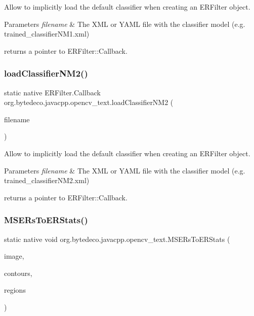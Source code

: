 Allow to implicitly load the default classifier when creating an E\+R\+Filter object. 


\begin{DoxyParams}{Parameters}
{\em filename} & The X\+ML or Y\+A\+ML file with the classifier model (e.\+g. trained\+\_\+classifier\+N\+M1.\+xml) \\
\hline
\end{DoxyParams}
returns a pointer to E\+R\+Filter\+::\+Callback. \mbox{\label{group__text__detect_gaa41f7358b2e47c7e2b2831ad76410221}} 
\subsubsection{\texorpdfstring{load\+Classifier\+N\+M2()}{loadClassifierNM2()}}
{\footnotesize\ttfamily static native E\+R\+Filter.\+Callback org.\+bytedeco.\+javacpp.\+opencv\+\_\+text.\+load\+Classifier\+N\+M2 (\begin{DoxyParamCaption}\item[{@Str Byte\+Pointer}]{filename }\end{DoxyParamCaption})\hspace{0.3cm}{\ttfamily [static]}}



Allow to implicitly load the default classifier when creating an E\+R\+Filter object. 


\begin{DoxyParams}{Parameters}
{\em filename} & The X\+ML or Y\+A\+ML file with the classifier model (e.\+g. trained\+\_\+classifier\+N\+M2.\+xml) \\
\hline
\end{DoxyParams}
returns a pointer to E\+R\+Filter\+::\+Callback. \mbox{\label{group__text__detect_gad4c72b60ca712eeab78c52b946f649a2}} 
\subsubsection{\texorpdfstring{M\+S\+E\+Rs\+To\+E\+R\+Stats()}{MSERsToERStats()}}
{\footnotesize\ttfamily static native void org.\+bytedeco.\+javacpp.\+opencv\+\_\+text.\+M\+S\+E\+Rs\+To\+E\+R\+Stats (\begin{DoxyParamCaption}\item[{@By\+Val Mat}]{image,  }\item[{@By\+Ref fr.antproject.utils.Point\+Vector\+Vector}]{contours,  }\item[{@By\+Ref E\+R\+Stat\+Vector\+Vector}]{regions }\end{DoxyParamCaption})\hspace{0.3cm}{\ttfamily [static]}}




